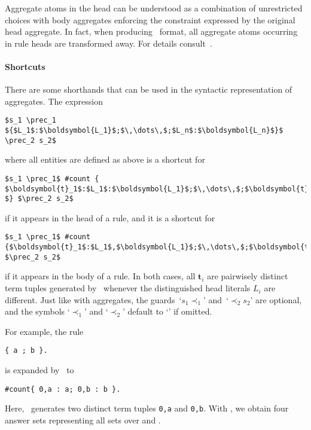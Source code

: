 \begin{note}
Aggregate atoms in the head can be understood as a combination of unrestricted choices with body aggregates enforcing the constraint expressed by the
original head aggregate.
In fact, when producing \smodels\ format, all aggregate atoms occurring in rule heads are transformed away.
For details consult~\cite{siniso02a,gekakasc12a}.
\end{note}

\paragraph{Shortcuts}
There are some shorthands that can be used in the syntactic representation of aggregates.
%
The expression
%
\begin{lstlisting}[numbers=none,mathescape]
$s_1 \prec_1 ${$L_1$:$\boldsymbol{L_1}$;$\,\dots\,$;$L_n$:$\boldsymbol{L_n}$}$ \prec_2 s_2$
\end{lstlisting}
%
where all entities are defined as above
is a shortcut for
%
\begin{lstlisting}[numbers=none,mathescape]
$s_1 \prec_1$ #count { $\boldsymbol{t}_1$:$L_1$:$\boldsymbol{L_1}$;$\,\dots\,$;$\boldsymbol{t}_n$:$L_n$:$\boldsymbol{L_n} $} $\prec_2 s_2$
\end{lstlisting}
%
if it appears in the head of a rule, and
it is a shortcut for
%
\begin{lstlisting}[numbers=none,mathescape]
$s_1 \prec_1$ #count {$\boldsymbol{t}_1$:$L_1$,$\boldsymbol{L_1}$;$\,\dots\,$;$\boldsymbol{t}_n$:$L_n$,$\boldsymbol{L_n}$} $\prec_2 s_2$
\end{lstlisting}
%
if it appears in the body of a rule.
In both cases, all $\boldsymbol{t}_i$ are pairwisely distinct term tuples generated by \gringo\
whenever the distinguished head literals $L_i$ are different.
%
Just like with aggregates, the guards~`$s_1\prec_1$' and~`$\prec_2 s_2$' are optional, and the symbols `$\prec_1$' and `$\prec_2$' default to `\code{<=}' if omitted.

For example, the rule
\begin{lstlisting}[numbers=none]
{ a ; b }.
\end{lstlisting}
is expanded by \gringo\ to
\begin{lstlisting}[numbers=none]
#count{ 0,a : a; 0,b : b }.
\end{lstlisting}
Here, \gringo\ generates two distinct term tuples \lstinline{0,a} and \lstinline{0,b}.
With \clingo, we obtain four answer sets representing all sets over \code{a} and .

